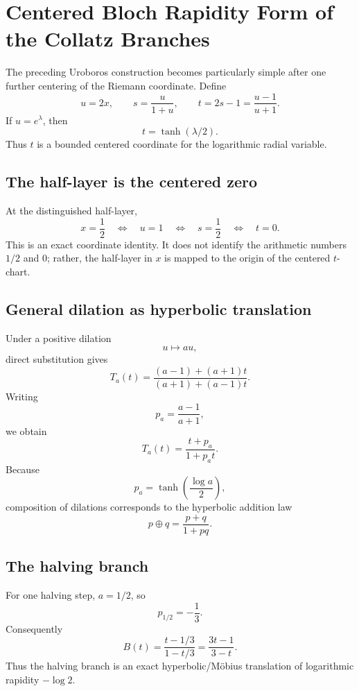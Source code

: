 \chapter{Centered Bloch Rapidity Form of the Collatz Branches}
\label{chap:bloch-rapidity-collatz}


The preceding Uroboros construction becomes particularly simple after one further centering of the Riemann coordinate.  Define
\[
u=2x,\qquad s=\frac{u}{1+u},\qquad t=2s-1=\frac{u-1}{u+1}.
\]
If \(u=e^\lambda\), then
\[
\boxed{t=\tanh(\lambda/2).}
\]
Thus \(t\) is a bounded centered coordinate for the logarithmic radial variable.

\section{The half-layer is the centered zero}

At the distinguished half-layer,
\[
 x=\frac12\quad\Longleftrightarrow\quad u=1
 \quad\Longleftrightarrow\quad s=\frac12
 \quad\Longleftrightarrow\quad \boxed{t=0}.
\]
This is an exact coordinate identity.  It does not identify the arithmetic numbers \(1/2\) and \(0\); rather, the half-layer in \(x\) is mapped to the origin of the centered \(t\)-chart.

\section{General dilation as hyperbolic translation}

Under a positive dilation
\[
u\mapsto au,
\]
direct substitution gives
\[
T_a(t)=
\frac{(a-1)+(a+1)t}{(a+1)+(a-1)t}.
\]
Writing
\[
p_a=\frac{a-1}{a+1},
\]
we obtain
\[
\boxed{T_a(t)=\frac{t+p_a}{1+p_at}.}
\]
Because
\[
p_a=\tanh\!\left(\frac{\log a}{2}\right),
\]
composition of dilations corresponds to the hyperbolic addition law
\[
\boxed{p\oplus q=\frac{p+q}{1+pq}.}
\]

\section{The halving branch}

For one halving step, \(a=1/2\), so
\[
p_{1/2}=-\frac13.
\]
Consequently
\[
\boxed{
B(t)=\frac{t-1/3}{1-t/3}
     =\frac{3t-1}{3-t}.
}
\]
Thus the halving branch is an exact hyperbolic/M\"obius translation of logarithmic rapidity \(-\log2\).

